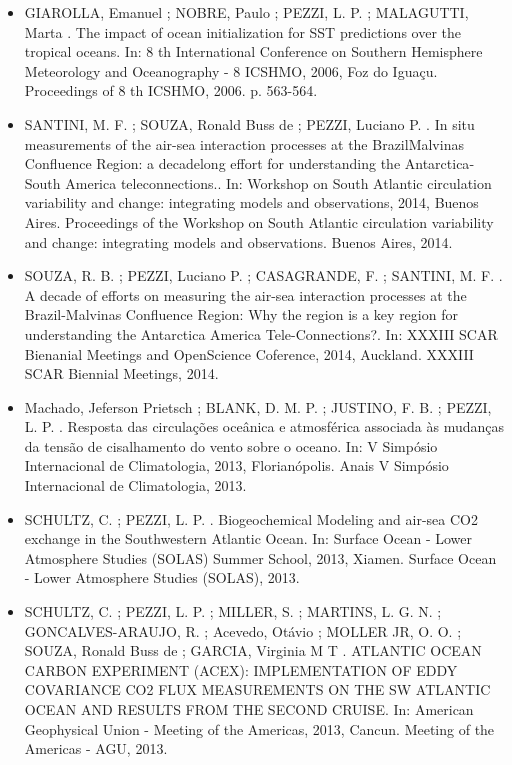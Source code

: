 \documentclass[11pt, a4paper]{awesome-cv}
\begin{document}
\begin{cvletter}
\begin{itemize}
\item[] GIAROLLA, Emanuel ; NOBRE, Paulo ; PEZZI, L. P. ; MALAGUTTI, Marta . The impact of ocean initialization for SST predictions over the tropical oceans. In: 8 th International Conference on Southern Hemisphere Meteorology and Oceanography - 8 ICSHMO, 2006, Foz do Iguaçu. Proceedings of 8 th ICSHMO, 2006. p. 563-564. 
\end{itemize}

\begin{itemize}
\item[] SANTINI, M. F. ; SOUZA, Ronald Buss de ; PEZZI, Luciano P. . In situ measurements of the air­-sea interaction processes at the Brazil­Malvinas Confluence Region: a decade­long effort for understanding the Antarctica­ South America tele­connections.. In: Workshop on South Atlantic circulation variability and change: integrating models and observations, 2014, Buenos Aires. Proceedings of the Workshop on South Atlantic circulation variability and change: integrating models and observations. Buenos Aires, 2014. 
\item[] SOUZA, R. B. ; PEZZI, Luciano P. ; CASAGRANDE, F. ; SANTINI, M. F. . A decade of efforts on measuring the air-­sea interaction processes at the Brazil­-Malvinas Confluence Region: Why the region is a key region for understanding the Antarctica America Tele­-Connections?. In: XXXIII SCAR Bienanial Meetings and OpenScience Coference, 2014, Auckland. XXXIII SCAR Biennial Meetings, 2014. 
\item[] Machado, Jeferson Prietsch ; BLANK, D. M. P. ; JUSTINO, F. B. ; PEZZI, L. P. . Resposta das circulações oceânica e atmosférica associada às mudanças da tensão de cisalhamento do vento sobre o oceano. In: V Simpósio Internacional de Climatologia, 2013, Florianópolis. Anais V Simpósio Internacional de Climatologia, 2013. 
\item[] SCHULTZ, C. ; PEZZI, L. P. . Biogeochemical Modeling and air-sea CO2 exchange in the Southwestern Atlantic Ocean. In: Surface Ocean - Lower Atmosphere Studies (SOLAS) Summer School, 2013, Xiamen. Surface Ocean - Lower Atmosphere Studies (SOLAS), 2013.
\item[] SCHULTZ, C. ; PEZZI, L. P. ; MILLER, S. ; MARTINS, L. G. N. ; GONCALVES-ARAUJO, R. ; Acevedo, Otávio ; MOLLER JR, O. O. ; SOUZA, Ronald Buss de ; GARCIA, Virginia M T . ATLANTIC OCEAN CARBON EXPERIMENT (ACEX): IMPLEMENTATION OF EDDY COVARIANCE CO2 FLUX MEASUREMENTS ON THE SW ATLANTIC OCEAN AND RESULTS FROM THE SECOND CRUISE. In: American Geophysical Union - Meeting of the Americas, 2013, Cancun. Meeting of the Americas - AGU, 2013. 

\end{itemize}
\end{cvletter}
\end{document}
